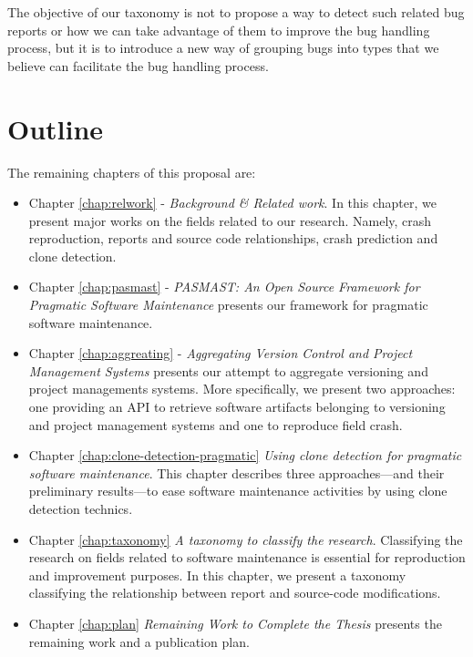 The objective of our taxonomy is not to propose a way to
detect such related bug reports or how we can take advantage
of them to improve the bug handling process, but it is to
introduce a new way of grouping bugs into types that we
believe can facilitate the bug handling process.

\section{Outline\label{sec:outline}}

The remaining chapters of this proposal are:

\begin{itemize}
	\item Chapter \ref{chap:relwork} - {\it Background \& Related work}.
	In this chapter, we present major works on the fields related to our research. Namely, crash reproduction, reports and source code relationships, crash prediction and clone detection.
	\item Chapter \ref{chap:pasmast} - {\it PASMAST: An Open Source Framework for Pragmatic Software Maintenance} presents our framework for pragmatic software maintenance.
	\item Chapter \ref{chap:aggreating} - {\it Aggregating Version Control and Project Management Systems} presents our attempt to aggregate versioning and project managements systems.
	More specifically, we present two approaches: one providing an API to retrieve software artifacts belonging to versioning and project management systems and one to reproduce field crash.
	\item Chapter \ref{chap:clone-detection-pragmatic} {\it Using clone detection for pragmatic software maintenance}.
	This chapter describes three approaches---and their preliminary results---to ease software maintenance activities by using clone detection technics.
	\item Chapter \ref{chap:taxonomy} {\it A taxonomy to classify the research}. Classifying the research on fields related to software maintenance is essential for reproduction and improvement purposes.
	In this chapter, we present a taxonomy classifying the relationship between report and source-code modifications.
	\item Chapter \ref{chap:plan} {\it Remaining Work to Complete the
Thesis} presents  the remaining work and a publication plan.
\end{itemize}
